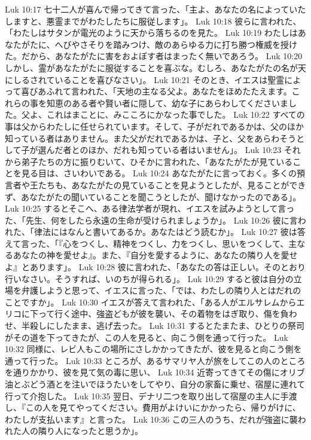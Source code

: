 Luk 10:17  七十二人が喜んで帰ってきて言った、「主よ、あなたの名によっていたしますと、悪霊までがわたしたちに服従します」。
Luk 10:18  彼らに言われた、「わたしはサタンが電光のように天から落ちるのを見た。
Luk 10:19  わたしはあなたがたに、へびやさそりを踏みつけ、敵のあらゆる力に打ち勝つ権威を授けた。だから、あなたがたに害をおよぼす者はまったく無いであろう。
Luk 10:20  しかし、霊があなたがたに服従することを喜ぶな。むしろ、あなたがたの名が天にしるされていることを喜びなさい」。
Luk 10:21  そのとき、イエスは聖霊によって喜びあふれて言われた、「天地の主なる父よ。あなたをほめたたえます。これらの事を知恵のある者や賢い者に隠して、幼な子にあらわしてくださいました。父よ、これはまことに、みこころにかなった事でした。
Luk 10:22  すべての事は父からわたしに任せられています。そして、子がだれであるかは、父のほか知っている者はありません。また父がだれであるかは、子と、父をあらわそうとして子が選んだ者とのほか、だれも知っている者はいません」。
Luk 10:23  それから弟子たちの方に振りむいて、ひそかに言われた、「あなたがたが見ていることを見る目は、さいわいである。
Luk 10:24  あなたがたに言っておく。多くの預言者や王たちも、あなたがたの見ていることを見ようとしたが、見ることができず、あなたがたの聞いていることを聞こうとしたが、聞けなかったのである」。
Luk 10:25  するとそこへ、ある律法学者が現れ、イエスを試みようとして言った、「先生、何をしたら永遠の生命が受けられましょうか」。
Luk 10:26  彼に言われた、「律法にはなんと書いてあるか。あなたはどう読むか」。
Luk 10:27  彼は答えて言った、「『心をつくし、精神をつくし、力をつくし、思いをつくして、主なるあなたの神を愛せよ』。また、『自分を愛するように、あなたの隣り人を愛せよ』とあります」。
Luk 10:28  彼に言われた、「あなたの答は正しい。そのとおり行いなさい。そうすれば、いのちが得られる」。
Luk 10:29  すると彼は自分の立場を弁護しようと思って、イエスに言った、「では、わたしの隣り人とはだれのことですか」。
Luk 10:30  イエスが答えて言われた、「ある人がエルサレムからエリコに下って行く途中、強盗どもが彼を襲い、その着物をはぎ取り、傷を負わせ、半殺しにしたまま、逃げ去った。
Luk 10:31  するとたまたま、ひとりの祭司がその道を下ってきたが、この人を見ると、向こう側を通って行った。
Luk 10:32  同様に、レビ人もこの場所にさしかかってきたが、彼を見ると向こう側を通って行った。
Luk 10:33  ところが、あるサマリヤ人が旅をしてこの人のところを通りかかり、彼を見て気の毒に思い、
Luk 10:34  近寄ってきてその傷にオリブ油とぶどう酒とを注いでほうたいをしてやり、自分の家畜に乗せ、宿屋に連れて行って介抱した。
Luk 10:35  翌日、デナリ二つを取り出して宿屋の主人に手渡し、『この人を見てやってください。費用がよけいにかかったら、帰りがけに、わたしが支払います』と言った。
Luk 10:36  この三人のうち、だれが強盗に襲われた人の隣り人になったと思うか」。
